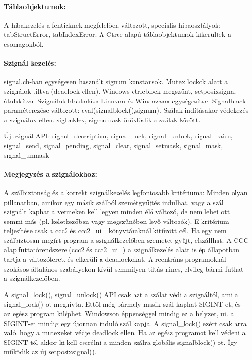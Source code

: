 \begin{description}
    \paragraph{Táblaobjektumok:}
    A hibakezelés a fentieknek megfelelően változott,
    speciális hibaosztályok: tabStructError, tabIndexError.
    A Ctree alapú táblaobjektumok kikerültek a csomagokból.

  \paragraph{Szignál kezelés:}\label{SIGNAL}
    signal.ch-ban egységesen használt signum konstansok.
    Mutex lockok alatt a szignálok tiltva (deadlock ellen).
    Windows ctrlcblock megszűnt, setposixsignal átalakítva.
    Szignálok blokkolása Linuxon és Windowson egységesítve.
    Signalblock paraméterezése változott: eval(signalblock(),signum).
    Szálak indításakor védekezés a szignálok ellen.
    siglocklev, sigcccmask öröklődik a szálak között.

    Új szignál API: 
        signal\_description, signal\_lock, signal\_unlock,
        signal\_raise, signal\_send, signal\_pending, signal\_clear, 
        signal\_setmask, signal\_mask, signal\_unmask.

  \paragraph{Megjegyzés a szignálokhoz:}
    A szálbiztonság és a korrekt szignálkezelés legfontosabb
    kritériuma: Minden olyan pillanatban, amikor egy másik 
    szálból szemétgyűjtés indulhat, vagy a szál szignált kaphat 
    a vermeken kell legyen minden élő változó, de nem lehet 
    ott semmi más (pl. keletkezőben vagy megszűnőben levő változók). 
    E kritérium  teljesítése csak a ccc2 és ccc2\_ui\_ könyvtáraknál 
    kitűzött cél. Ha egy nem szálbiztosan megírt program 
    a szignálkezelőben  szemetet gyűjt, elszállhat.
    A CCC alap futtatórendszere (ccc2 és ccc2\_ui\_) a szignálkezelés 
    alatt is ép állapotban tartja a változóteret, és elkerüli 
    a deadlockokat.  A reentráns programoknál szokásos általános
    szabályokon kívül semmilyen tiltás nincs, elvileg  bármi
    futhat a szignálkezelőben.

    A signal\_lock(), signal\_unlock() API csak azt a szálat védi
    a szignáltól, ami a signal\_lock()-ot meghívta. Ettől még bármely
    másik szál kaphat SIGINT-et, és az egész program kiléphet.
    Windowson éppenséggel mindig ez a helyzet, ui. a SIGINT-et
    mindig egy újonnan induló szál kapja. A signal\_lock() ezért
    csak arra való, hogy a mutexeket védje deadlock ellen.
    Ha az egész programot kell védeni a SIGINT-től akkor ki kell
    cserélni a minden szálra globális signalblock()-ot. Így
    működik az új setposixsignal().


\end{description}
